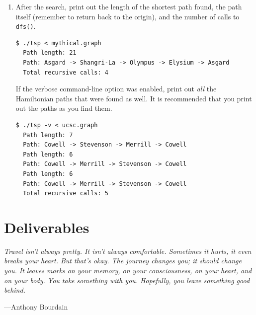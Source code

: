 \documentclass[11pt]{article}
\begin{document}
\begin{enumerate}
  \item After the search, print out the length of the shortest path
    found, the path itself (remember to return back to the origin), and
    the number of calls to \texttt{dfs()}.

\begin{lstlisting}[style=bashstyle]
  $ ./tsp < mythical.graph
  Path length: 21
  Path: Asgard -> Shangri-La -> Olympus -> Elysium -> Asgard
  Total recursive calls: 4
\end{lstlisting}

    If the verbose command-line option was enabled, print out \emph{all}
    the Hamiltonian paths that were found as well. It is recommended
    that you print out the paths as you find them.

\begin{lstlisting}[style=bashstyle]
  $ ./tsp -v < ucsc.graph
  Path length: 7
  Path: Cowell -> Stevenson -> Merrill -> Cowell
  Path length: 6
  Path: Cowell -> Merrill -> Stevenson -> Cowell
  Path length: 6
  Path: Cowell -> Merrill -> Stevenson -> Cowell
  Total recursive calls: 5
\end{lstlisting}
\end{enumerate}

\section{Deliverables}

\textwidth \epigraph{\emph{Travel isn't always
    pretty. It isn't always comfortable. Sometimes it hurts, it even
    breaks your heart. But that's okay. The journey changes you; it
    should change you. It leaves marks on your memory, on your
consciousness, on your heart, and on your body. You take something with
you. Hopefully, you leave something good behind.}}{---Anthony Bourdain
}
\end{document}
